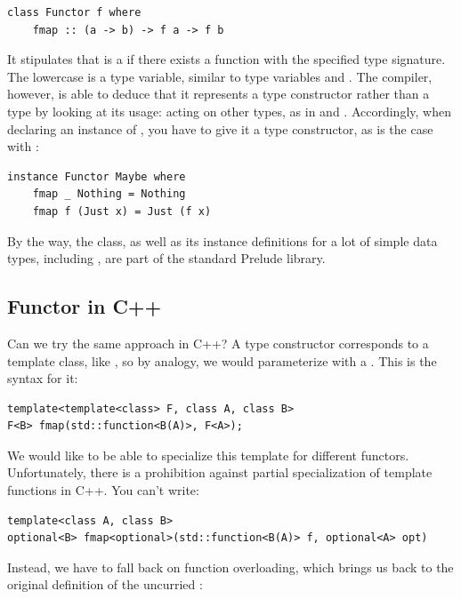 \begin{Verbatim}[commandchars=\\\{\}]
class Functor f where
    fmap :: (a -> b) -> f a -> f b
\end{Verbatim}
It stipulates that  is a  if there exists a
function  with the specified type signature. The lowercase
 is a type variable, similar to type variables  and
. The compiler, however, is able to deduce that it represents
a type constructor rather than a type by looking at its usage: acting on
other types, as in  and . Accordingly, when
declaring an instance of , you have to give it a type
constructor, as is the case with :

\begin{Verbatim}[commandchars=\\\{\}]
instance Functor Maybe where
    fmap _ Nothing = Nothing
    fmap f (Just x) = Just (f x)
\end{Verbatim}
By the way, the  class, as well as its instance
definitions for a lot of simple data types, including ,
are part of the standard Prelude library.

\subsection{Functor in C++}\label{functor-in-c}

Can we try the same approach in C++? A type constructor corresponds to a
template class, like , so by analogy, we would
parameterize  with a 
. This is the syntax for it:

\begin{Verbatim}
template<template<class> F, class A, class B>
F<B> fmap(std::function<B(A)>, F<A>);
\end{Verbatim}
We would like to be able to specialize this template for different
functors. Unfortunately, there is a prohibition against partial
specialization of template functions in C++. You can't write:

\begin{Verbatim}
template<class A, class B>
optional<B> fmap<optional>(std::function<B(A)> f, optional<A> opt)
\end{Verbatim}
Instead, we have to fall back on function overloading, which brings us
back to the original definition of the uncurried :

